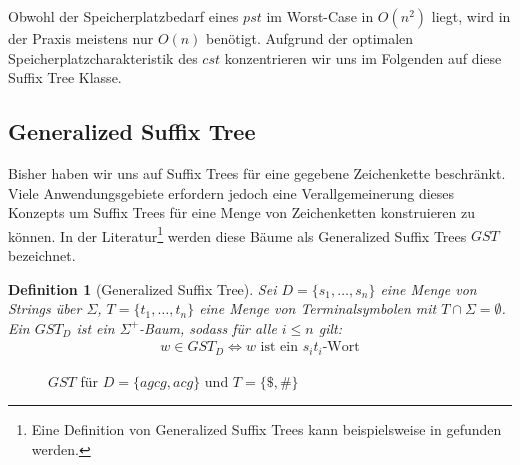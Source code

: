 \documentclass[12pt]{report}
\newtheorem{definition}{Definition}
\begin{document}
Obwohl der Speicherplatzbedarf eines $pst$ im Worst-Case in $O(n^2)$ liegt, wird in der Praxis meistens nur $O(n)$ benötigt.
Aufgrund der optimalen Speicherplatzcharakteristik des $cst$ konzentrieren wir uns im Folgenden auf diese Suffix Tree Klasse.

\subsection{Generalized Suffix Tree}
\label{sec:GeneralizedSuffixTree}

Bisher haben wir uns auf Suffix Trees für eine gegebene Zeichenkette beschränkt. Viele Anwendungsgebiete erfordern jedoch eine Verallgemeinerung dieses Konzepts um Suffix Trees für eine Menge von Zeichenketten konstruieren zu können. In der Literatur\footnote{Eine Definition von Generalized Suffix Trees kann beispielsweise in \cite{Gusfield1997} gefunden werden.} werden diese Bäume als Generalized Suffix Trees $GST$ bezeichnet.

\begin{definition}[Generalized Suffix Tree]
Sei $D = \{s_1, \dots, s_n\}$ eine Menge von Strings über $\Sigma$, $T = \{t_1, \dots, t_n\}$ eine Menge von Terminalsymbolen mit $T \cap \Sigma = \emptyset$. Ein $GST_D$ ist ein $\Sigma^+$-Baum, sodass für alle $i \leq n$ gilt:
\begin{gather*}
    w \in GST_D \Longleftrightarrow w \text{ ist ein } s_it_i\text{-Wort}
\end{gather*}
\label{def:GeneralizedSuffixTree}
\end{definition}

\begin{figure}[htb]
\centering
{}
\caption{$GST$ für $D = \{agcg, acg\}$ und $T = \{\$, \#\}$}
\label{fig:GSTAgcgAcg}
\end{figure}
\end{document}
